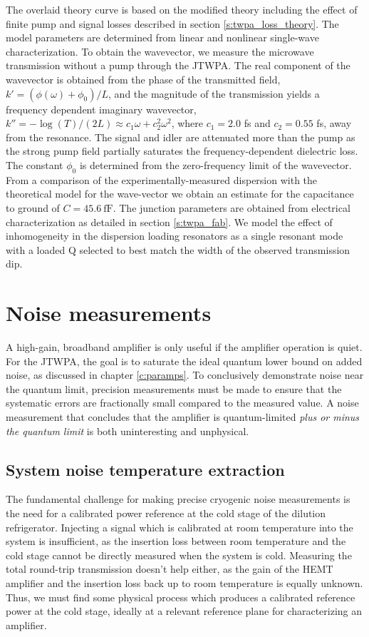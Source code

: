 The overlaid theory curve is based on the modified theory including the effect of finite pump and signal losses described in section \ref{s:twpa_loss_theory}.  The model parameters are determined from linear and nonlinear single-wave characterization. To obtain the wavevector, we measure the microwave transmission without a pump through the JTWPA. The real component of the wavevector is obtained from the phase of the transmitted field, $k' = (\phi(\omega)+\phi_0)/L$, and the magnitude of the transmission yields a frequency dependent imaginary wavevector, $k''=-\log(T)/(2L) \approx c_1 \omega + c_2^2 \omega^2$, where $c_1 = 2.0$ fs and $c_2 = 0.55$ fs,  away from the resonance. The signal and idler are attenuated more than the pump as the strong pump field partially saturates the frequency-dependent dielectric loss. The constant $\phi_0$ is determined from the zero-frequency limit of the wavevector. From a comparison of the experimentally-measured dispersion with the theoretical model for the wave-vector we obtain an estimate for the capacitance to ground of $C=45.6~\mathrm{fF}$. The junction parameters are obtained from electrical characterization as detailed in section \ref{s:twpa_fab}. We model the effect of inhomogeneity in the dispersion loading resonators as a single resonant mode with a loaded Q selected to best match the width of the observed transmission dip.

\section{Noise measurements}

A high-gain, broadband amplifier is only useful if the amplifier operation is quiet.  For the JTWPA, the goal is to saturate the ideal quantum lower bound on added noise, as discussed in chapter \ref{c:paramps}.  To conclusively demonstrate noise near the quantum limit, precision measurements must be made to ensure that the systematic errors are fractionally small compared to the measured value.  A noise measurement that concludes that the amplifier is quantum-limited \textit{plus or minus the quantum limit} is both uninteresting and unphysical.

\subsection{System noise temperature extraction}

The fundamental challenge for making precise cryogenic noise measurements is the need for a calibrated power reference at the cold stage of the dilution refrigerator.  Injecting a signal which is calibrated at room temperature into the system is insufficient, as the insertion loss between room temperature and the cold stage cannot be directly measured when the system is cold.  Measuring the total round-trip transmission doesn't help either, as the gain of the HEMT amplifier and the insertion loss back up to room temperature is equally unknown.  Thus, we must find some physical process which produces a calibrated reference power at the cold stage, ideally at a relevant reference plane for characterizing an amplifier.

